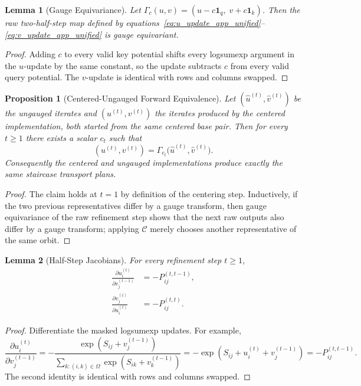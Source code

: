 \documentclass{article}
\newtheorem{proposition}{Proposition}
\newtheorem{lemma}{Lemma}
\begin{document}
\begin{lemma}[Gauge Equivariance]
Let $\Gamma_c(u,v)=(u-c\mathbf{1}_q,\; v+c\mathbf{1}_k)$. Then the raw two-half-step map defined by equations~\eqref{eq:u_update_app_unified}--\eqref{eq:v_update_app_unified} is gauge equivariant.
\end{lemma}

\begin{proof}
Adding $c$ to every valid key potential shifts every logsumexp argument in the $u$-update by the same constant, so the update subtracts $c$ from every valid query potential. The $v$-update is identical with rows and columns swapped.
\end{proof}

\begin{proposition}[Centered-Ungauged Forward Equivalence]
Let $(\widehat u^{(t)},\widehat v^{(t)})$ be the ungauged iterates and $(u^{(t)},v^{(t)})$ the iterates produced by the centered implementation, both started from the same centered base pair. Then for every $t\ge 1$ there exists a scalar $c_t$ such that
\[
(u^{(t)},v^{(t)})=\Gamma_{c_t}\bigl(\widehat u^{(t)},\widehat v^{(t)}\bigr).
\]
Consequently the centered and ungauged implementations produce exactly the same staircase transport plans.
\end{proposition}

\begin{proof}
The claim holds at $t=1$ by definition of the centering step. Inductively, if the two previous representatives differ by a gauge transform, then gauge equivariance of the raw refinement step shows that the next raw outputs also differ by a gauge transform; applying $\mathcal{C}$ merely chooses another representative of the same orbit.
\end{proof}

\begin{lemma}[Half-Step Jacobians]
For every refinement step $t\ge 1$,
\begin{align}
    \frac{\partial u_i^{(t)}}{\partial v_j^{(t-1)}} &= -P_{ij}^{(t,t-1)}, \\
    \frac{\partial v_j^{(t)}}{\partial u_i^{(t)}} &= -P_{ij}^{(t,t)}.
\end{align}
\end{lemma}

\begin{proof}
Differentiate the masked logsumexp updates. For example,
\[
\frac{\partial u_i^{(t)}}{\partial v_j^{(t-1)}}
=
-
\frac{\exp(S_{ij}+v_j^{(t-1)})}{\sum_{k:(i,k)\in\Omega}\exp(S_{ik}+v_k^{(t-1)})}
=
-\exp(S_{ij}+u_i^{(t)}+v_j^{(t-1)})
=
-P_{ij}^{(t,t-1)}.
\]
The second identity is identical with rows and columns swapped.
\end{proof}
\end{document}
